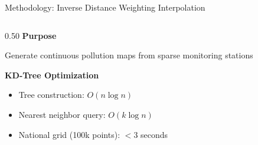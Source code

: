 \documentclass[aspectratio=169,10pt]{beamer}
\begin{document}
\begin{frame}{Methodology: Inverse Distance Weighting Interpolation}
\begin{columns}[T]
    \begin{column}{0.50\textwidth}
        \textbf{\color{primaryblue}\small Purpose}
        \vspace{0.05cm}

        \footnotesize
        Generate continuous pollution maps from sparse monitoring stations

        \vspace{0.15cm}

        \vspace{0.15cm}
        \textbf{\color{primaryblue}\footnotesize KD-Tree Optimization}
        \scriptsize
        \begin{itemize}\setlength{\itemsep}{2pt}
            \item Tree construction: $O(n \log n)$
            \item Nearest neighbor query: $O(k \log n)$
            \item National grid (100k points): $<$3 seconds
        \end{itemize}
    \end{column}


\end{columns}
\end{frame}
\end{document}
